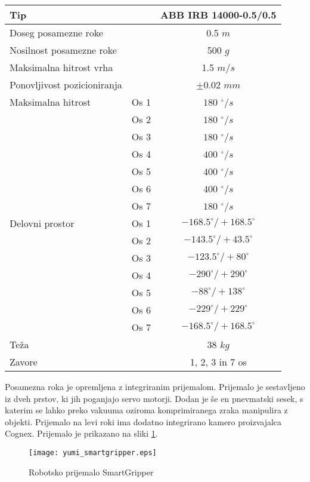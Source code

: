 \begin{center}
	\begin{tabular}{|lr|c|}
		\hline   Tip &  & ABB IRB 14000-0.5/0.5 \\
		\hline Doseg posamezne roke & & 0.5 $m$ \\
		\hline Nosilnost posamezne roke & & 500 $g$ \\
		\hline Maksimalna hitrost vrha & & 1.5 $m/s$ \\
		\hline Ponovljivost pozicioniranja& & $\pm 0.02 $ $mm$ \\
		\hline Maksimalna hitrost
		& Os 1 & $180$ $^\circ/s$ \\
		& Os 2 & $180$ $^\circ/s$ \\
		& Os 3 & $180$ $^\circ/s$ \\
		& Os 4 & $400$ $^\circ/s$ \\
		& Os 5 & $400$ $^\circ/s$ \\
		& Os 6 & $400$ $^\circ/s$ \\
		& Os 7 & $180$ $^\circ/s$ \\
		\hline Delovni prostor
		& Os 1 & $-168.5^\circ/+168.5^\circ$\\
		& Os 2 & $-143.5^\circ/+43.5^\circ$\\
		& Os 3 & $-123.5^\circ/+80^\circ$\\
		& Os 4 & $-290^\circ/+290^\circ$\\
		& Os 5 & $-88^\circ/+138^\circ$\\
		& Os 6 & $-229^\circ/+229^\circ$\\
		& Os 7 & $-168.5^\circ/+168.5^\circ$\\
		\hline   Teža &  & $38$ $kg$ \\
		\hline   Zavore &  & 1, 2, 3 in 7 os \\
		\hline
	\end{tabular}
\end{center}




Posamezna roka je opremljena z integriranim prijemalom. Prijemalo je sestavljeno iz dveh prstov, ki jih poganjajo servo motorji. Dodan je še en pnevmatski sesek, s katerim se lahko preko vakuuma oziroma komprimiranega zraka manipulira z objekti. Prijemalo na levi roki ima dodatno integrirano kamero proizvajalca Cognex. Prijemalo je prikazano na sliki \ref{fig:yumi_smartgripper}.

\begin{figure}[!hbt]
	\centering
	\texttt{[image: yumi\_smartgripper.eps]}
	\caption{Robotsko prijemalo SmartGripper}
	\label{fig:yumi_smartgripper}
\end{figure}


